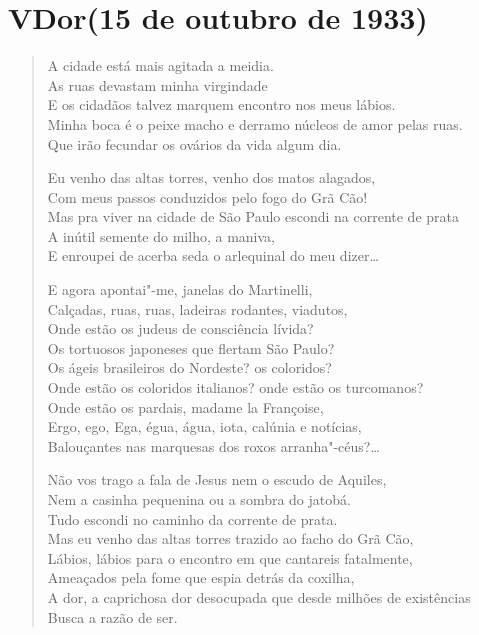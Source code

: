 \pagebreak
{}
\section*{V\break Dor\break (15 de outubro de 1933)}

\begin{verse}
A cidade está mais agitada a meidia.\\
As ruas devastam minha virgindade\\
E os cidadãos talvez marquem encontro nos meus lábios.\\
Minha boca é o peixe macho e derramo núcleos de amor pelas ruas.\\
Que irão fecundar os ovários da vida algum dia.

Eu venho das altas torres, venho dos matos alagados,\\
Com meus passos conduzidos pelo fogo do Grã Cão!\\
Mas pra viver na cidade de São Paulo escondi na corrente de prata\\
A inútil semente do milho, a maniva,\\
E enroupei de acerba seda o arlequinal do meu dizer\ldots{}

E agora apontai"-me, janelas do Martinelli,\\
Calçadas, ruas, ruas, ladeiras rodantes, viadutos,\\
Onde estão os judeus de consciência lívida?\\
Os tortuosos japoneses que flertam São Paulo?\\
Os ágeis brasileiros do Nordeste? os coloridos?\\
Onde estão os coloridos italianos? onde estão os turcomanos?\\
Onde estão os pardais, madame la Françoise,\\
Ergo, ego, Ega, égua, água, iota, calúnia e notícias,\\
Balouçantes nas marquesas dos roxos arranha"-céus?\ldots{}

Não vos trago a fala de Jesus nem o escudo de Aquiles,\\
Nem a casinha pequenina ou a sombra do jatobá.\\
Tudo escondi no caminho da corrente de prata.\\
Mas eu venho das altas torres trazido ao facho do Grã Cão,\\
Lábios, lábios para o encontro em que cantareis fatalmente,\\
Ameaçados pela fome que espia detrás da coxilha,\\
A dor, a caprichosa dor desocupada que desde milhões de existências\\
Busca a razão de ser.
\end{verse}


